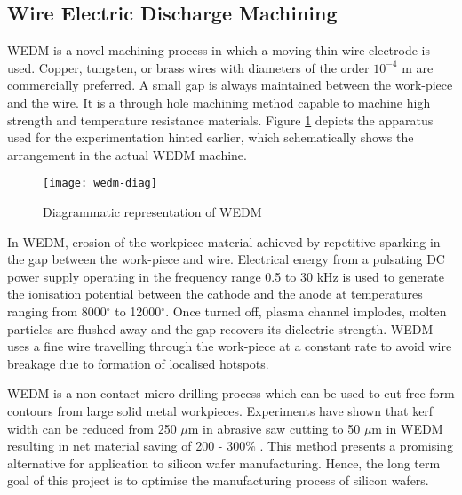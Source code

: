 \subsection{Wire Electric Discharge Machining}
	WEDM is a novel machining process in which a moving thin wire electrode is used. Copper, tungsten, or brass wires with diameters of the order $10^{-4}$ m are commercially preferred. A small gap is always maintained between the work-piece and the wire. It is a through hole machining method capable to machine high strength and temperature resistance materials. Figure \ref{fig:lit-1} depicts the apparatus used for the experimentation hinted earlier, which schematically shows the arrangement in the actual WEDM machine.

	\begin{figure}[H]
		\centering
		\texttt{[image: wedm-diag]}
		\caption{Diagrammatic representation of WEDM}
		\label{fig:lit-1}
	\end{figure}

	In WEDM, erosion of the workpiece material achieved by repetitive sparking in the gap between the work-piece and wire. Electrical energy from a pulsating DC power supply operating in the frequency range 0.5 to 30 kHz is used to generate the ionisation potential between the cathode and the anode at temperatures ranging from 8000$^\circ$ to 12000$^\circ$. Once turned off, plasma channel implodes, molten particles are flushed away and the gap recovers its dielectric strength. WEDM uses a fine wire travelling through the work-piece at a constant rate to avoid wire breakage due to formation of localised hotspots.

	
	WEDM is a non contact micro-drilling process which can be used to cut free form contours from large solid metal workpieces. Experiments have shown that kerf width can be reduced from 250 $\mu$m in abrasive saw cutting to 50 $\mu$m in WEDM resulting in net material saving of 200 - 300\% \cite{dongre2015multi}. This method presents a promising alternative for application to silicon wafer manufacturing. Hence, the long term goal of this project is to optimise the manufacturing process of silicon wafers.

